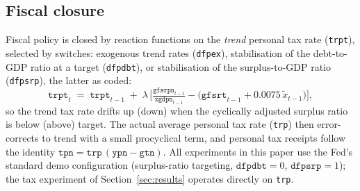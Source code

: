 \subsection{Fiscal closure}
\label{sec:fiscal-closure}

Fiscal policy is closed by reaction functions on the \emph{trend} personal tax rate (\texttt{trpt}), selected by switches: exogenous trend rates (\texttt{dfpex}), stabilisation of the debt-to-GDP ratio at a target (\texttt{dfpdbt}), or stabilisation of the surplus-to-GDP ratio (\texttt{dfpsrp}), the latter as coded:
\begin{equation}
\texttt{trpt}_t \;=\; \texttt{trpt}_{t-1} \;+\; \lambda\,\Big[\tfrac{\texttt{gfsrpn}_{t-1}}{\texttt{xgdpn}_{t-1}} - \big(\texttt{gfsrt}_{t-1}+0.0075\,\tilde x_{t-1}\big)\Big],
\label{eq:trpt}
\end{equation}
so the trend tax rate drifts up (down) when the cyclically adjusted surplus ratio is below (above) target. The actual average personal tax rate (\texttt{trp}) then error-corrects to trend with a small procyclical term, and personal tax receipts follow the identity $\texttt{tpn}=\texttt{trp}\,(\texttt{ypn}-\texttt{gtn})$. All experiments in this paper use the Fed's standard demo configuration (surplus-ratio targeting, $\texttt{dfpdbt}=0$, $\texttt{dfpsrp}=1$); the tax experiment of Section~\ref{sec:results} operates directly on \texttt{trp}.
